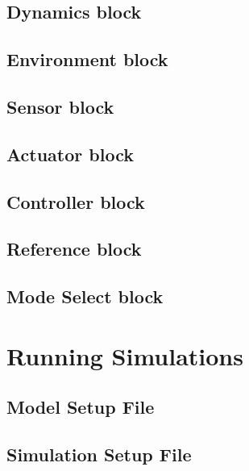 \subsection{Dynamics block}
\subsection{Environment block}
\subsection{Sensor block}
\subsection{Actuator block}
\subsection{Controller block}
\subsection{Reference block}
\subsection{Mode Select block}

\section{Running Simulations}
\subsection{Model Setup File}
\subsection{Simulation Setup File}